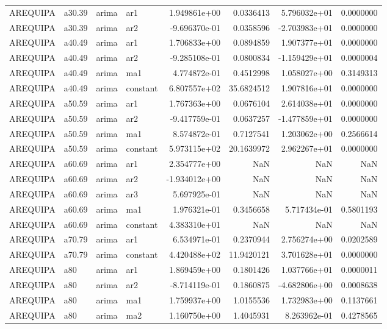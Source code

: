 \documentclass[
]{article}
\begin{document}
\begin{table}[!h]
\begin{tabular}[t]{llllrrrr}
AREQUIPA & a30.39 & arima & ar1 & 1.949861e+00 & 0.0336413 & 5.796032e+01 & 0.0000000\\
AREQUIPA & a30.39 & arima & ar2 & -9.696370e-01 & 0.0358596 & -2.703983e+01 & 0.0000000\\
\addlinespace
AREQUIPA & a40.49 & arima & ar1 & 1.706833e+00 & 0.0894859 & 1.907377e+01 & 0.0000000\\
AREQUIPA & a40.49 & arima & ar2 & -9.285108e-01 & 0.0800834 & -1.159429e+01 & 0.0000004\\
AREQUIPA & a40.49 & arima & ma1 & 4.774872e-01 & 0.4512998 & 1.058027e+00 & 0.3149313\\
AREQUIPA & a40.49 & arima & constant & 6.807557e+02 & 35.6824512 & 1.907816e+01 & 0.0000000\\
AREQUIPA & a50.59 & arima & ar1 & 1.767363e+00 & 0.0676104 & 2.614038e+01 & 0.0000000\\
\addlinespace
AREQUIPA & a50.59 & arima & ar2 & -9.417759e-01 & 0.0637257 & -1.477859e+01 & 0.0000000\\
AREQUIPA & a50.59 & arima & ma1 & 8.574872e-01 & 0.7127541 & 1.203062e+00 & 0.2566614\\
AREQUIPA & a50.59 & arima & constant & 5.973115e+02 & 20.1639972 & 2.962267e+01 & 0.0000000\\
AREQUIPA & a60.69 & arima & ar1 & 2.354777e+00 & NaN & NaN & NaN\\
AREQUIPA & a60.69 & arima & ar2 & -1.934012e+00 & NaN & NaN & NaN\\
\addlinespace
AREQUIPA & a60.69 & arima & ar3 & 5.697925e-01 & NaN & NaN & NaN\\
AREQUIPA & a60.69 & arima & ma1 & 1.976321e-01 & 0.3456658 & 5.717434e-01 & 0.5801193\\
AREQUIPA & a60.69 & arima & constant & 4.383310e+01 & NaN & NaN & NaN\\
AREQUIPA & a70.79 & arima & ar1 & 6.534971e-01 & 0.2370944 & 2.756274e+00 & 0.0202589\\
AREQUIPA & a70.79 & arima & constant & 4.420488e+02 & 11.9420121 & 3.701628e+01 & 0.0000000\\
\addlinespace
AREQUIPA & a80 & arima & ar1 & 1.869459e+00 & 0.1801426 & 1.037766e+01 & 0.0000011\\
AREQUIPA & a80 & arima & ar2 & -8.714119e-01 & 0.1860875 & -4.682806e+00 & 0.0008638\\
AREQUIPA & a80 & arima & ma1 & 1.759937e+00 & 1.0155536 & 1.732983e+00 & 0.1137661\\
AREQUIPA & a80 & arima & ma2 & 1.160750e+00 & 1.4045931 & 8.263962e-01 & 0.4278565\\

\end{tabular}
\end{table}
\end{document}
